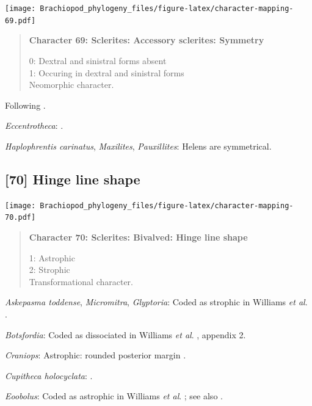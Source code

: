 \documentclass[openany]{book}
\begin{document}
\texttt{[image: Brachiopod\_phylogeny\_files/figure-latex/character-mapping-69.pdf]}

\begin{quote}
\textbf{Character 69: Sclerites: Accessory sclerites: Symmetry}

0: Dextral and sinistral forms absent\\
1: Occuring in dextral and sinistral forms\\
Neomorphic character.
\end{quote}

Following \citet{Zhao2017}.

\hypertarget{Eccentrotheca-coding-69}{}
\emph{Eccentrotheca}: \citet{Skovsted2008Thescleritome}.

\hypertarget{Haplophrentis_carinatus-coding-69}{}
\emph{Haplophrentis carinatus}, \emph{Maxilites}, \emph{Pauxillites}:
Helens are symmetrical.

\subsection*{{[}70{]} Hinge line shape}\label{hinge-line-shape}

\texttt{[image: Brachiopod\_phylogeny\_files/figure-latex/character-mapping-70.pdf]}

\begin{quote}
\textbf{Character 70: Sclerites: Bivalved: Hinge line shape}

1: Astrophic\\
2: Strophic\\
Transformational character.
\end{quote}

\hypertarget{Askepasma_toddense-coding-70}{}
\emph{Askepasma toddense}, \emph{Micromitra}, \emph{Glyptoria}: Coded as
strophic in Williams \emph{et al}.
\citeyearpar{Williams1998Thediversity}.

\hypertarget{Botsfordia-coding-70}{}
\emph{Botsfordia}: Coded as dissociated in Williams \emph{et al}.
\citeyearpar{Williams1998Thediversity}, appendix 2.

\hypertarget{Craniops-coding-70}{}
\emph{Craniops}: Astrophic: rounded posterior margin \citep[see fig. 91
in][]{Williams2000LinguliformeaCraniiformea}.

\hypertarget{Cupitheca_holocyclata-coding-70}{}
\emph{Cupitheca holocyclata}: \citep{Skovsted2016}.

\hypertarget{Eoobolus-coding-70}{}
\emph{Eoobolus}: Coded as astrophic in Williams \emph{et al}.
\citeyearpar{Williams1998Thediversity}; see also
\citet{Balthasar2009Thebrachiopod}.
\end{document}
